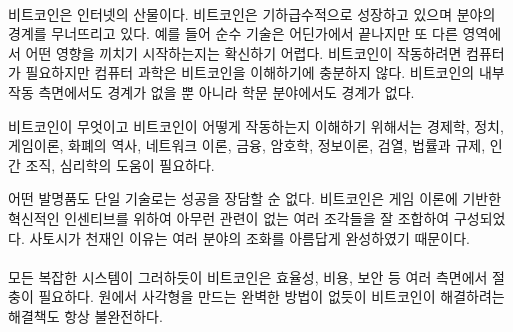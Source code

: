 \paragraph{} 
\begin{comment}Bitcoin is a child of the internet. It is growing exponentially,
	blurring the lines between disciplines. It isn’t clear, for example, where the
	realm of pure technology ends and where another realm begins. Even though
	Bitcoin requires computers to function efficiently, computer science is not
	sufficient to understand it. Bitcoin is not only borderless in regards to its
	inner workings but also boundaryless in respect to academic disciplines.
\end{comment}
비트코인은 인터넷의 산물이다. 
비트코인은 기하급수적으로 성장하고 있으며 분야의 경계를 무너뜨리고 있다.
예를 들어 순수 기술은 어딘가에서 끝나지만 또 다른 영역에서 어떤 영향을 끼치기 시작하는지는 확신하기 어렵다.
비트코인이 작동하려면 컴퓨터가 필요하지만 컴퓨터 과학은 비트코인을 이해하기에 충분하지 않다.
비트코인의 내부 작동 측면에서도 경계가 없을 뿐 아니라 학문 분야에서도 경계가 없다.

\begin{comment}
	Economics, politics, game theory, monetary history, network theory, finance,
	cryptography, information theory, censorship, law and regulation, human
	organization, psychology -- all these and more are areas of expertise which might
	help in the quest of understanding how Bitcoin works and what Bitcoin is.
\end{comment}
비트코인이 무엇이고 비트코인이 어떻게 작동하는지 이해하기 위해서는 
경제학, 정치, 게임이론, 화폐의 역사, 네트워크 이론, 금융, 암호학, 정보이론, 검열, 법률과 규제,
인간 조직, 심리학의 도움이 필요하다.


\begin{comment}
	No single invention is responsible for its success. It is the combination of
	multiple, previously unrelated pieces, glued together by game theoretical
	incentives, which make up the revolution that is Bitcoin. The beautiful blend of
	many disciplines is what makes Satoshi a genius.
\end{comment}
어떤 발명품도 단일 기술로는 성공을 장담할 순 없다. 
비트코인은 게임 이론에 기반한 혁신적인 인센티브를 위하여
아무런 관련이 없는 여러 조각들을 잘 조합하여 구성되었다.
사토시가 천재인 이유는 여러 분야의 조화를 아름답게 완성하였기 때문이다.


\paragraph{} 
\begin{comment}Like every complex system, Bitcoin has to make tradeoffs in terms
	of efficiency, cost, security, and many other properties. Just like there is no
	perfect solution to deriving a square from a circle, any solution to the
	problems which Bitcoin tries to solve will always be imperfect as well.
\end{comment}
모든 복잡한 시스템이 그러하듯이 비트코인은 효율성, 비용, 보안 등 여러 측면에서 절충이 필요하다.
원에서 사각형을 만드는 완벽한 방법이 없듯이 
비트코인이 해결하려는 해결책도 항상 불완전하다.

